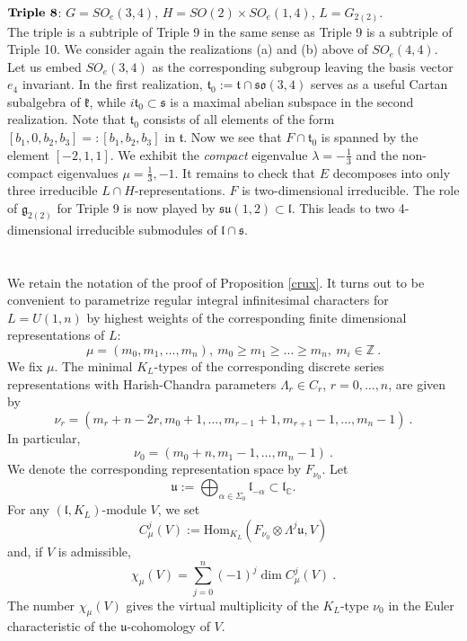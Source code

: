 \documentclass[10]{amsart}
\theoremstyle{remark}
\theoremstyle{definition}
\numberwithin{equation}{section}
\newcommand{\C}{\mathbb{C}}           %
\newcommand{\Z}{\mathbb{Z}}         %
\newcommand{\Hom}{\mathrm{Hom}}
\newcommand{\ind}{{\chi}}
\newcommand{\fg}{{\mathfrak g}}
\newcommand{\fk}{{\mathfrak k}}
\newcommand{\fl}{{\mathfrak l}}
\newcommand{\fo}{{\mathfrak{so}}}
\newcommand{\ft}{{\mathfrak t}}
\newcommand{\fu}{{\mathfrak u}}
\newcommand{\fs}{{\mathfrak s}}
\begin{document}
{\underline{$\text{\bf Triple 8}$}: $G=SO_{e}(3,4)$, $H=SO(2)\times SO_{e}(1,4)$, $L=G_{2(2)}$.\\
The triple is a subtriple of Triple 9 in the same sense as Triple 9 is a subtriple of Triple 10. We consider again the realizations (a) and (b) above of $SO_e(4,4)$. Let us embed $SO_e(3,4)$ as the corresponding subgroup leaving the basis vector $e_4$ invariant. In the first realization, $\ft_0:=\ft\cap\fo(3,4)$ serves as a useful Cartan subalgebra of $\fk$, while
$i\ft_0\subset\fs$ is a maximal abelian subspace in the second realization. Note that $\ft_0$ consists of all elements of the form
$[b_1,0,b_2, b_3]=:[b_1,b_2,b_3]$ in $\ft$. Now we see that $F\cap\ft_0$ is spanned by the element $[-2,1,1]$. We exhibit the {\it compact} eigenvalue $\lambda=-\frac{1}{3}$
and the non-compact eigenvalues $\mu=\frac{1}{3}, -1$. It remains to check that $E$ decomposes into only three irreducible $L\cap H$-representations.
$F$ is two-dimensional irreducible. The role of $\fg_{2(2)}$ for Triple 9 is now played by $\fs\fu(1,2)\subset\fl$. This leads to two 4-dimensional irreducible submodules of $\fl\cap\fs$. 




\appendix
\setcounter{section}{1}
\section{}\label{B}

We retain the notation of the proof of Proposition \ref{crux}. It turns out to be convenient to parametrize regular integral infinitesimal characters for $L=U(1,n)$ by highest weights
of the corresponding finite dimensional representations of  $L$:
$$ \mu =(m_0,m_1,\dots,m_n),\ m_0\ge m_1\ge\dots\ge m_n,\ m_i\in\Z\ .$$
We fix $\mu$. The minimal $K_L$-types of the corresponding discrete series representations with Harish-Chandra parameters $\Lambda_r\in C_r$, $r=0,\dots,n$, are given by
$$ \nu_{r}=(m_r+n-2r, m_0+1,\dots,m_{r-1}+1,m_{r+1}-1,\dots, m_n-1)\ .$$
In particular,
$$ \nu_0=(m_0+n,m_1-1,\dots,m_n-1)\ .$$ 
We denote the corresponding representation space by $F_{\nu_0}$. Let
$$\fu:=\bigoplus_{\alpha\in\Sigma_0}\fl_{-\alpha}\subset \fl_\C .$$
For any $(\fl,K_L)$-module $V$, we set
$$ C^j_\mu(V):=\Hom_{K_L}(F_{\nu_0}\otimes \Lambda^j\fu, V)$$
and, if $V$ is admissible,
$$ \ind_\mu(V)=\sum_{j=0}^{n}(-1)^j\dim C^j_\mu(V)\ .$$
The number $\ind_\mu(V)$ gives the virtual multiplicity of the $K_L$-type $\nu_0$ in the Euler characteristic of the $\fu$-cohomology of $V$.

}
\end{document}
